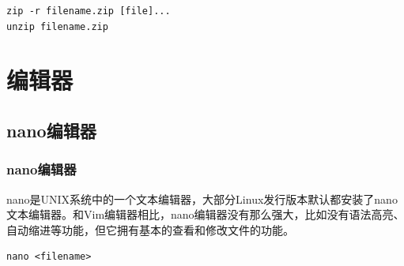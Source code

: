 \documentclass[12pt, openany, oneside]{book}
\begin{document}
\vspace{-0.5cm}
\begin{lstlisting}
zip -r filename.zip [file]...
unzip filename.zip
\end{lstlisting}

\begin{table}[H]
	\centering
	\caption{\lstinline|zip|参数说明}
\end{table}

\newpage

\chapter{编辑器}

\section{nano编辑器}

\subsection{nano编辑器}

nano是UNIX系统中的一个文本编辑器，大部分Linux发行版本默认都安装了nano文本编辑器。和Vim编辑器相比，nano编辑器没有那么强大，比如没有语法高亮、自动缩进等功能，但它拥有基本的查看和修改文件的功能。

\vspace{-0.5cm}
\begin{lstlisting}
nano <filename>
\end{lstlisting}
\end{document}
